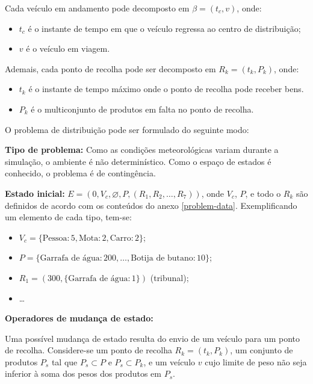 \documentclass[12pt, a4paper]{article}
\begin{document}
Cada veículo em andamento pode decomposto em $\beta = (t_c, v)$, onde:

\begin{itemize}
    \item $t_c$ é o instante de tempo em que o veículo regressa ao centro de distribuição;
    \item $v$ é o veículo em viagem.
\end{itemize}

Ademais, cada ponto de recolha pode ser decomposto em $R_k = (t_k, P_k)$, onde:

\begin{itemize}
    \item $t_k$ é o instante de tempo máximo onde o ponto de recolha pode receber bens.
    \item $P_k$ é o multiconjunto de produtos em falta no ponto de recolha.
\end{itemize}

O problema de distribuição pode ser formulado do seguinte modo:

\textbf{Tipo de problema:} Como as condições meteorológicas variam durante a simulação, o ambiente é
não determinístico. Como o espaço de estados é conhecido, o problema é de contingência.

\textbf{Estado inicial:} $E = (0, V_c, \varnothing, P, (R_1, R_2, \ldots, R_7))$, onde $V_c$, $P$, e
todo o $R_k$ são definidos de acordo com os conteúdos do anexo \ref{problem-data}. Exemplificando um
elemento de cada tipo, tem-se:

\begin{itemize}
    \item $V_c = \lbrace \text{Pessoa}: 5, \text{Mota}: 2, \text{Carro}: 2 \rbrace$;
    \item $P = \lbrace \text{Garrafa de água}: 200, \ldots, \text{Botija de butano}: 10 \rbrace$;
    \item $R_1 = (300, \lbrace \text{Garrafa de água}: 1 \rbrace)$ {\color{gray} (tribunal)};
    \item \ldots
\end{itemize}

\textbf{Operadores de mudança de estado:}

Uma possível mudança de estado resulta do envio de um veículo para um ponto de recolha. Considere-se
um ponto de recolha $R_k = (t_k, P_k)$, um conjunto de produtos $P_s$ tal que $P_s \subset P$ e
$P_s \subset P_k$, e um veículo $v$ cujo limite de peso não seja inferior à soma dos pesos dos
produtos em $P_s$.
\end{document}
